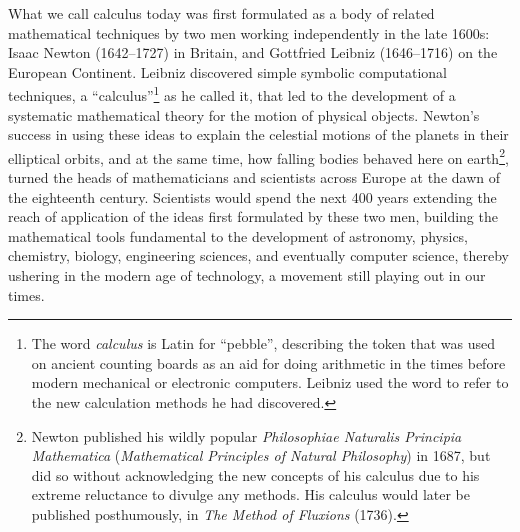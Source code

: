 \message{ !name(LHopitalsRule_2021.03.29.tex)}\documentclass[11pt]{article}
\begin{document}
What we call calculus today was first formulated as a body of related mathematical techniques by two men working independently in the late 1600s: Isaac Newton (1642--1727) in Britain, and Gottfried Leibniz (1646--1716) on the European Continent. Leibniz discovered simple symbolic computational techniques, a ``calculus''\footnote{The word \emph{calculus} is Latin for ``pebble'', describing the token that was used on ancient counting boards as an aid for doing arithmetic in the times before modern mechanical or electronic computers. Leibniz used the word to refer to the new calculation methods he had discovered.}  as he called it, that led to the development of a systematic mathematical theory for the motion of physical objects. Newton's success in using these ideas to explain the celestial motions of the planets in their elliptical orbits, and at the same time, how falling bodies behaved here on earth\footnote{Newton published his wildly popular \emph{Philosophiae Naturalis Principia Mathematica} (\emph{Mathematical Principles of Natural Philosophy}) in 1687, but did so without acknowledging the new concepts of his calculus due to his extreme reluctance to divulge any methods. His calculus would later be published posthumously, in \emph{The Method of Fluxions} (1736).}, turned the heads of mathematicians and scientists across Europe at the dawn of the eighteenth century. Scientists would spend the next 400 years extending the reach of application of the ideas first formulated by these two men, building the mathematical tools fundamental to the development of astronomy, physics, chemistry, biology, engineering sciences, and eventually computer science, thereby ushering in the modern age of technology, a movement still playing out in our times.
\end{document}
